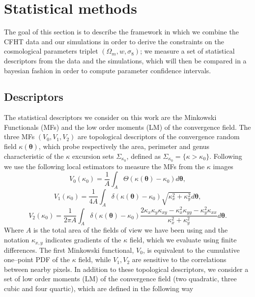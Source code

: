 \documentclass[reprint,aps,prd,superscriptaddress,showkeys]{revtex4-1}
\begin{document}

\section{Statistical methods}
The goal of this section is to describe the framework in which we combine the CFHT data and our simulations in order to derive the constraints on the cosmological parameters triplet $(\Omega_m,w,\sigma_8)$; we measure a set of statistical descriptors from the data and the simulations, which will then be compared in a bayesian fashion in order to compute parameter confidence intervals.

\subsection{Descriptors}
The statistical descriptors we consider on this work are the Minkowski Functionals (MFs) and the low order moments (LM) of the convergence field. The three MFs $(V_0,V_1,V_2)$ are topological descriptors of the convergence random field $\kappa(\pmb{\theta})$, which probe respectively the area, perimeter and genus characteristic of the $\kappa$ excursion sets $\Sigma_{\kappa_0}$, defined as $\Sigma_{\kappa_0}=\{\kappa>\kappa_0\}$. Following \citep{Petri2013,MinkJan} we use the following local estimators to measure the MFs from the $\kappa$ images
%
\begin{equation*}
\label{v0meas}
V_0(\kappa_0)=\frac{1}{A}\int_A\Theta(\kappa(\pmb{\theta})-\kappa_0)d\pmb{\theta},
\end{equation*}
\begin{equation}
\label{v1meas}
V_1(\kappa_0)=\frac{1}{4A}\int_A\delta(\kappa(\pmb{\theta})-\kappa_0)\sqrt{\kappa_x^2+\kappa_y^2}d\pmb{\theta},
\end{equation}
\begin{equation*}
\label{v2meas}
V_2(\kappa_0)=\frac{1}{2\pi A}\int_A\delta(\kappa(\pmb{\theta})-\kappa_0)\frac{2\kappa_x\kappa_y\kappa_{xy}-\kappa_x^2\kappa_{yy}-\kappa_y^2\kappa_{xx}}{\kappa_x^2+\kappa_y^2}d\pmb{\theta}.
\end{equation*}
%
Where $A$ is the total area of the fields of view we have been using and the notation $\kappa_{x,y}$ indicates gradients of the $\kappa$ field, which we evaluate using finite differences. The first Minkowski functional, $V_0$, is equivalent to the cumulative one--point PDF of the $\kappa$ field, while $V_1,V_2$ are sensitive to the correlations between nearby pixels. In addition to these topological descriptors, we consider a set of low order moments (LM) of the convergence field (two quadratic, three cubic and four quartic), which are defined in the following way
\end{document}
